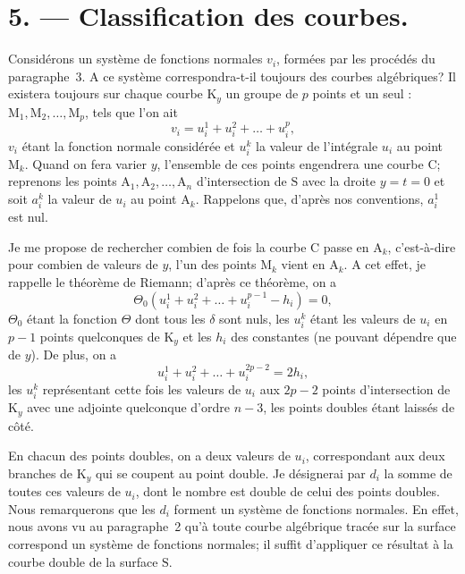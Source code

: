 \documentclass{article}
\begin{document}
\section*{5. --- Classification des courbes.}

Considérons un système de fonctions normales $v_{i}$, formées par les procédés du paragraphe~3. A ce système correspondra-t-il toujours des courbes algébriques? Il existera toujours sur chaque courbe $\mathrm{K}_{y}$ un groupe de $p$ points et un seul : $\mathrm{M}_{1}, \mathrm{M}_{2}, \ldots, \mathrm{M}_{p}$, tels que l'on ait
\[
v_{i} = u_{i}^{1} + u_{i}^{2} + \ldots + u_{i}^{p},
\]
$v_{i}$ étant la fonction normale considérée et $u_{i}^{k}$ la valeur de l'intégrale $u_{i}$ au point $\mathrm{M}_{k}$. Quand on fera varier $y$, l'ensemble de ces points engendrera une courbe $\mathrm{C}$; reprenons les points $\mathrm{A}_{1}, \mathrm{A}_{2}, \ldots, \mathrm{A}_{n}$ d'intersection de $\mathrm{S}$ avec la droite $y = t = 0$ et soit $a_{i}^{k}$ la valeur de $u_{i}$ au point $\mathrm{A}_{k}$. Rappelons que, d'après nos conventions, $a_{i}^{1}$ est nul.

Je me propose de rechercher combien de fois la courbe $\mathrm{C}$ passe en $\mathrm{A}_{k}$, c'est-à-dire pour combien de valeurs de $y$, l'un des points $\mathrm{M}_{k}$ vient en $\mathrm{A}_{k}$. A cet effet, je rappelle le théorème de Riemann; d'après ce théorème, on a
\[
\Theta_{0}(u_{i}^{1} + u_{i}^{2} + \ldots + u_{i}^{p-1} - h_{i}) = 0, \tag{1}
\]
$\Theta_{0}$ étant la fonction $\Theta$ dont tous les $\delta$ sont nuls, les $u_{i}^{k}$ étant les valeurs de $u_{i}$ en $p - 1$ points quelconques de $\mathrm{K}_{y}$ et les $h_{i}$ des constantes (ne pouvant dépendre que de $y$). De plus, on a
\[
u_{i}^{1} + u_{i}^{2} + \ldots + u_{i}^{2p-2} = 2h_{i}, \tag{2}
\]
les $u_{i}^{k}$ représentant cette fois les valeurs de $u_{i}$ aux $2p - 2$ points d'intersection de $\mathrm{K}_{y}$ avec une adjointe quelconque d'ordre $n - 3$, les points doubles étant laissés de côté.

En chacun des points doubles, on a deux valeurs de $u_{i}$, correspondant aux deux branches de $\mathrm{K}_{y}$ qui se coupent au point double. Je désignerai par $d_{i}$ la somme de toutes ces valeurs de $u_{i}$, dont le nombre est double de celui des points doubles. Nous remarquerons que les $d_{i}$ forment un système de fonctions normales. En effet, nous avons vu au paragraphe~2 qu'à toute courbe algébrique tracée sur la surface correspond un système de fonctions normales; il suffit d'appliquer ce résultat à la courbe double de la surface $\mathrm{S}$.
\end{document}
